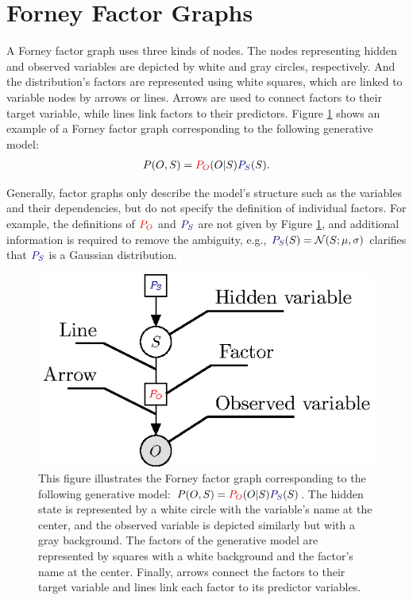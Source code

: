 \documentclass[twoside,11pt]{article}
\begin{document}
\section{Forney Factor Graphs}\label{sec:ffg}

A Forney factor graph \citep{FFG_TUTO} uses three kinds of nodes. The nodes representing hidden and observed variables are depicted by white and gray circles, respectively. And the distribution's factors are represented using white squares, which are linked to variable nodes by arrows or lines. Arrows are used to connect factors to their target variable, while lines link factors to their predictors. Figure \ref{fig:type-elements-ffg} shows an example of a Forney factor graph corresponding to the following generative model:
\begin{align} \label{eq:general-generative-model}
P(O,S) = {\color{red!90!black}P_{O}}(O|S){\color{blue!50!black}P_{S}}(S).
\end{align}

Generally, factor graphs only describe the model's structure such as the variables and their dependencies, but do not specify the definition of individual factors. For example, the definitions of ${\color{red!90!black}P_{O}}$ and ${\color{blue!50!black}P_{S}}$ are not given by Figure \ref{fig:type-elements-ffg}, and additional information is required to remove the ambiguity, e.g., ${\color{blue!50!black}P_{S}}(S) = \mathcal{N}(S;\mu, \sigma)$ clarifies that ${\color{blue!50!black}P_{S}}$ is a Gaussian distribution.

\begin{figure}[H]
	\begin{center}
	\includegraphics[scale=1]{BTAI-figure0}
	\end{center}
	\caption[Forney Factor Graph]{This figure illustrates the Forney factor graph corresponding to the following generative model: $P(O,S) = {\color{red!90!black}P_{O}}(O|S){\color{blue!50!black}P_{S}}(S)$. The hidden state is represented by a white circle with the variable's name at the center, and the observed variable is depicted similarly but with a gray background. The factors of the generative model are represented by squares with a white background and the factor's name at the center. Finally, arrows connect the factors to their target variable and lines link each factor to its predictor variables.}
    \label{fig:type-elements-ffg}
\end{figure}
\end{document}
